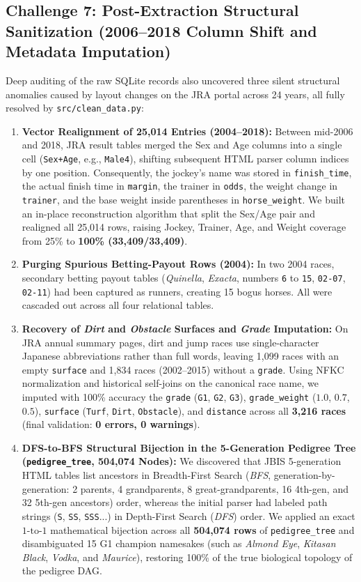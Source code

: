\documentclass[12pt,a4paper]{article}
\begin{document}
\subsection{Challenge 7: Post-Extraction Structural Sanitization (2006--2018 Column Shift and Metadata Imputation)}
Deep auditing of the raw SQLite records also uncovered three silent structural anomalies caused by layout changes on the JRA portal across 24 years, all fully resolved by \texttt{src/clean\_data.py}:
\begin{enumerate}
    \item \textbf{Vector Realignment of 25,014 Entries (2004--2018):} Between mid-2006 and 2018, JRA result tables merged the Sex and Age columns into a single cell (\texttt{Sex+Age}, e.g., \texttt{Male4}), shifting subsequent HTML parser column indices by one position. Consequently, the jockey's name was stored in \texttt{finish\_time}, the actual finish time in \texttt{margin}, the trainer in \texttt{odds}, the weight change in \texttt{trainer}, and the base weight inside parentheses in \texttt{horse\_weight}. We built an in-place reconstruction algorithm that split the Sex/Age pair and realigned all 25,014 rows, raising Jockey, Trainer, Age, and Weight coverage from 25\% to \textbf{100\% (33,409/33,409)}.
    \item \textbf{Purging Spurious Betting-Payout Rows (2004):} In two 2004 races, secondary betting payout tables (\textit{Quinella}, \textit{Exacta}, numbers \texttt{6} to \texttt{15}, \texttt{02-07}, \texttt{02-11}) had been captured as runners, creating 15 bogus horses. All were cascaded out across all four relational tables.
    \item \textbf{Recovery of \textit{Dirt} and \textit{Obstacle} Surfaces and \textit{Grade} Imputation:} On JRA annual summary pages, dirt and jump races use single-character Japanese abbreviations rather than full words, leaving 1,099 races with an empty \texttt{surface} and 1,834 races (2002--2015) without a \texttt{grade}. Using NFKC normalization and historical self-joins on the canonical race name, we imputed with 100\% accuracy the \texttt{grade} (\texttt{G1}, \texttt{G2}, \texttt{G3}), \texttt{grade\_weight} ($1.0$, $0.7$, $0.5$), \texttt{surface} (\texttt{Turf}, \texttt{Dirt}, \texttt{Obstacle}), and \texttt{distance} across all \textbf{3,216 races} (final validation: \textbf{0 errors, 0 warnings}).
    \item \textbf{DFS-to-BFS Structural Bijection in the 5-Generation Pedigree Tree (\texttt{pedigree\_tree}, 504,074 Nodes):} We discovered that JBIS 5-generation HTML tables list ancestors in Breadth-First Search (\textit{BFS}, generation-by-generation: 2 parents, 4 grandparents, 8 great-grandparents, 16 4th-gen, and 32 5th-gen ancestors) order, whereas the initial parser had labeled path strings (\texttt{S}, \texttt{SS}, \texttt{SSS}...) in Depth-First Search (\textit{DFS}) order. We applied an exact $1\text{-to-}1$ mathematical bijection across all \textbf{504,074 rows} of \texttt{pedigree\_tree} and disambiguated 15 G1 champion namesakes (such as \textit{Almond Eye}, \textit{Kitasan Black}, \textit{Vodka}, and \textit{Maurice}), restoring 100\% of the true biological topology of the pedigree DAG.
\end{enumerate}
\end{document}
